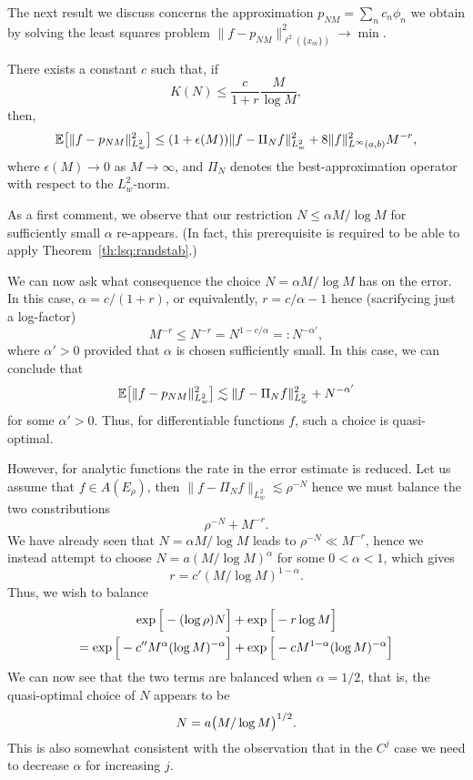 The next result  we discuss concerns the approximation $p_{NM} = \sum_n c_n
\phi_n$ we obtain by solving the least squares problem $\| f - p_{NM}
\|_{\ell^2(\{x_m\})}^2 \to \min$.

\begin{theorem} \label{th:lsq:randerr}
    There exists a constant $c$ such that, if
    \[
        K(N) \leq \frac{c}{1+r} \frac{M}{\log M},
    \]
    then,
    \[
        \mathbb{E}\big[ \|f - p_{NM}\|_{L^2_w}^2 \big]
        \leq
        (1+\epsilon(M)) \|f - \Pi_N f\|_{L^2_w}^2
        + 8 \|f\|_{L^\infty(a,b)}^2 M^{-r},
    \]
    where $\epsilon(M) \to 0$ as $M \to \infty$, and $\Pi_N$ denotes the
    best-approximation operator with respect to the $L^2_w$-norm.
\end{theorem}

As a first comment, we observe that our restriction $N \leq \alpha M / \log M$
for sufficiently small $\alpha$ re-appears. (In fact, this prerequisite is
required to be able to apply Theorem~\ref{th:lsq:randstab}.)

We can now ask what consequence the choice $N = \alpha M / \log M$ has
on the error. In this case, $\alpha = c / (1+r)$, or equivalently,
$r = c/\alpha - 1$ hence (sacrifycing just a log-factor)
\[
    M^{-r}  \leq N^{-r} = N^{1 - c/\alpha} =: N^{-\alpha'},
\]
where $\alpha' > 0$ provided that $\alpha$ is chosen sufficiently small. In this
case, we can conclude that
\[
    \mathbb{E}\big[ \|f - p_{NM}\|_{L^2_w}^2 \big]
    \lesssim
    \|f - \Pi_N f\|_{L^2_w}^2
    +
    N^{- \alpha'}
\]
for some $\alpha' > 0$. Thus, for differentiable functions $f$, such a choice is
quasi-optimal.

However, for analytic functions the rate in the error estimate is
reduced. Let us assume that $f \in A(E_\rho)$, then
$\| f - \Pi_N f \|_{L^2_w} \lesssim \rho^{-N}$ hence we must balance the
two constributions
\[
    \rho^{-N} + M^{-r}.
\]
We have already seen that $N = \alpha M/\log M$ leads to $\rho^{-N} \ll M^{-r}$,
hence we instead attempt to choose $N = a (M/\log M)^{\alpha}$ for some $0 < \alpha < 1$,
which gives
\[
    r = c' (M / \log M)^{1-\alpha}.
\]
Thus, we wish to balance
\begin{align*}
    \exp\Big[ - (\log \rho) N\Big]  &+ \exp\Big[ - r \log M \Big]  \\
    = \exp\Big[ - c'' M^\alpha (\log M)^{-\alpha} \Big]  &+ \exp\Big[ - c M^{1-\alpha} (\log M)^{-\alpha} \Big]
\end{align*}
We can now see that the two terms are balanced when $\alpha = 1/2$, that is,
the quasi-optimal choice of $N$ appears to be
\[
    N = a \big(M / \log M\big)^{1/2}.
\]
This is also somewhat consistent with the observation that in the $C^j$ case we
need to decrease $\alpha$ for increasing $j$.

